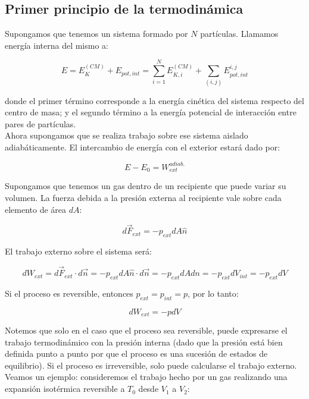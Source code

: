 \documentclass[a4paper]{article}
\begin{document}
\subsection{Primer principio de la termodin\'amica}

Supongamos que tenemos un sistema formado por $N$ part\'iculas. Llamamos energ\'ia interna del mismo a:

$$E = E_{K}^{(CM)} + E_{pot, int} = \sum_{i = 1}^{N} E_{K, i}^{(CM)} + \sum_{(i, j)} E_{pot, int}^{i, j}$$

donde el primer t\'ermino corresponde a la energ\'ia cin\'etica del sistema respecto del centro de masa; y el segundo t\'ermino a la energ\'ia potencial de interacci\'on entre pares de part\'iculas.\\

Ahora supongamos que se realiza trabajo sobre ese sistema aislado adiab\'aticamente. El intercambio de energ\'ia con el exterior estar\'a dado por:

$$E - E_{0} = W_{ext}^{adiab.}$$

Supongamos que tenemos un gas dentro de un recipiente que puede variar su volumen. La fuerza debida a la presi\'on externa al recipiente vale sobre cada elemento de \'area $dA$:

$$d\vec{F}_{ext} = -p_{ext}dA \hat{n}$$

El trabajo externo sobre el sistema ser\'a:

\begin{equation}
\label{eq:trabajo}
dW_{ext} = d\vec{F}_{ext} \cdot d\vec{n} = -p_{ext}dA\hat{n} \cdot d\vec{n} = -p_{ext}dAdn = -p_{ext}dV_{int} = -p_{ext}dV
\end{equation}

Si el proceso es reversible, entonces $p_{ext} = p_{int} = p$, por lo tanto:

\begin{equation}
\label{eq:trabajo2}
dW_{ext} = -pdV
\end{equation}

Notemos que solo en el caso que el proceso sea reversible, puede expresarse el trabajo termodin\'amico con la presi\'on interna (dado que la presi\'on est\'a bien definida punto a punto por que el proceso es una sucesi\'on de estados de equilibrio). Si el proceso es irreversible, solo puede calcularse el trabajo externo. \\

Veamos un ejemplo: consideremos el trabajo hecho por un gas realizando una expansi\'on isot\'ermica reversible a $T_{0}$ desde $V_{1}$ a $V_{2}$:
\end{document}
